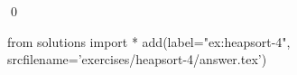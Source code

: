 
\begin{ex} 
  \label{ex:heapsort-4}
  
  \qed
\end{ex} 
\begin{python0}
from solutions import *
add(label="ex:heapsort-4",
    srcfilename='exercises/heapsort-4/answer.tex') 
\end{python0}
